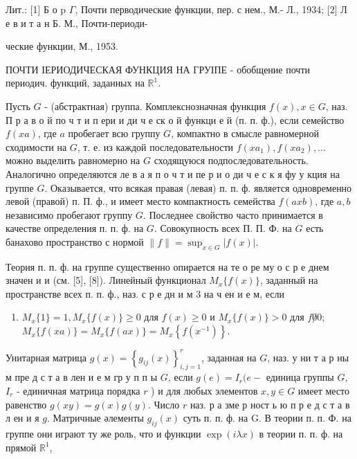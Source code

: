 \documentclass[10pt]{article}
\begin{document}
Лит.: [1] Б о p $\Gamma$, Почти перводические функции, пер. с нем., М.- Л., 1934; [2] Л е в и т а н Б. М., Почти-периоди-

ческие функции, М., 1953.



ПОЧТИ ІЕРИОДИЧЕСКАЯ ФУНКЦИЯ НА ГРУІПЕ - обобщение почти периодич. функций, заданных на $\mathbb{R}^{1}$.



Пусть $G$ - (абстрактная) группа. Комплекснозначная функция $f(x), x \in G$, наз. П р а в о й по ч т и п ери и ди ч е ск о й функци е й (п. п. ф.), если семейство $f(x a)$, где $a$ пробегает всю группу $G$, компактно в смысле равномерной сходимости на $G$, т. е. из каждой последовательности $f\left(x a_{1}\right), f\left(x a_{2}\right), \ldots$ можно выделить равномерно на $G$ сходящуюся подпоследовательность. Аналогично определяются ле в а я п о ч т и пе р и о ди ч е с к я фу у кция на группе $G$. Оказывается, что всякая правая (левая) п. п. ф. является одновременно левой (правой) п. П. ф., и имеет место компактность семейства $f(a x b)$, где $a, b$ независимо пробегают группу $G$. Последнее свойство часто принимается в качестве определения п. п. ф. на $G$. Совокупность всех П. П. Ф. на $G$ есть банахово пространство с нормой $\|f\|=\sup _{x \in G}|f(x)|$.



Теория п. п. ф. на группе существенно опирается на те о ре му о с р е днем значен и и (см. [5], [8]). Линейный функционал $M_{x}\{f(x)\}$, заданный на пространстве всех п. п. ф., наз. с р е дн и м 3 на ч ен и е м, если



\begin{enumerate}

  \item $M_{x}\{1\}=1, M_{x}\{f(x)\} \geqslant 0$ для $f(x) \geqslant 0$ и $M_{x}\{f(x)\}>0$ для $f \not 00$; $M_{x}\{f(x a)\}=M_{x}\{f(a x)\}=M_{x}\left\{f\left(x^{-1}\right)\right\}$.

\end{enumerate}



Унитарная матрица $g(x)=\left\{g_{i j}(x)\right\}_{i, j=1}^{r}$, заданная на $G$, наз. у ни т а р ны м пре д с т а в лен и е м гр у п п ы $G$, если $g(e)=I_{r}(e-$ единица группы $G$, $I_{r}$ - единичная матрица порядка $r$ ) и для любых элементов $x, y \in G$ имеет место равенство $g(x y)=g(x) g(y)$. Число $r$ наз. р а зме р ност ь ю п р е д с т а в л ен и я $g$. Матричные әлементы $g_{i j}(x)$ суть п. п. ф. на G. В теории п. п. Ф. на группе они играют ту же роль, что и функции $\exp (i \lambda x)$ в теории п. п. ф. на прямой $\mathbb{R}^{1}$,
\end{document}
